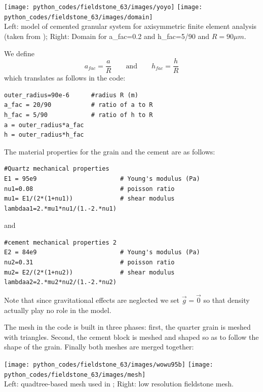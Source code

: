 \begin{center}
\texttt{[image: python\_codes/fieldstone\_63/images/yoyo]}
\texttt{[image: python\_codes/fieldstone\_63/images/domain]}\\
{\captionfont Left: model of cemented granular system for 
axisymmetric finite element analysis (taken from \cite{wowu95}); Right: 
Domain for a\_fac=0.2 and h\_fac=5/90 and $R=90\mu m$.}
\end{center}

We define
\[
a_{fac} = \frac{a}{R}  
\qquad
\text{and}
\qquad 
h_{fac} = \frac{h}{R}
\]
which translates as follows in the code:
\begin{lstlisting}
outer_radius=90e-6      #radius R (m)  
a_fac = 20/90           # ratio of a to R 
h_fac = 5/90            # ratio of h to R
a = outer_radius*a_fac
h = outer_radius*h_fac
\end{lstlisting}

The material properties for the grain and the cement are as follows:

\begin{lstlisting}
#Quartz mechanical properties
E1 = 95e9                       # Young's modulus (Pa)
nu1=0.08                        # poisson ratio
mu1= E1/(2*(1+nu1))             # shear modulus
lambdaa1=2.*mu1*nu1/(1.-2.*nu1)  
\end{lstlisting}
and
\begin{lstlisting}
#cement mechanical properties 2 
E2 = 84e9                       # Young's modulus (Pa)
nu2=0.31                        # poisson ratio
mu2= E2/(2*(1+nu2))             # shear modulus
lambdaa2=2.*mu2*nu2/(1.-2.*nu2)  
\end{lstlisting}

Note that since gravitational effects are neglected we set $\vec{g}=\vec{0}$
so that density actually play no role in the model.

The mesh in the code is built in three phases: first, the quarter grain is meshed 
with triangles. Second, the cement block is meshed and shaped so as to follow the 
shape of the grain. Finally both meshes are merged together:

\begin{center}
\texttt{[image: python\_codes/fieldstone\_63/images/wowu95b]}
\texttt{[image: python\_codes/fieldstone\_63/images/mesh]}\\
{\captionfont Left: quadtree-based mesh used in \cite{wowu95}; 
Right: low resolution fieldstone mesh.}
\end{center}

